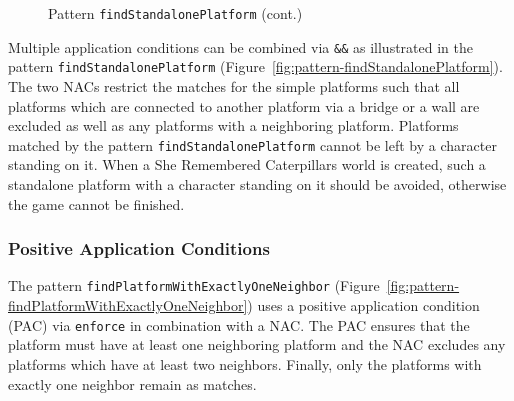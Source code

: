 \begin{figure}[h!]
	\ContinuedFloat
	\centering
	\caption[]{Pattern \texttt{findStandalonePlatform} (cont.)}
\end{figure}

\noindent
Multiple application conditions can be combined via \texttt{\&\&} as illustrated in the pattern \texttt{findStandalonePlatform} (Figure~\ref{fig:pattern-findStandalonePlatform}).
The two NACs restrict the matches for the simple platforms such that all platforms which are connected to another platform via a bridge or a wall are excluded as well as any platforms with a neighboring platform.
Platforms matched by the pattern \texttt{findStandalonePlatform} cannot be left by a character standing on it.
When a She Remembered Caterpillars world is created, such a standalone platform with a character standing on it should be avoided, otherwise the game cannot be finished.

\subsubsection{Positive Application Conditions}
The pattern \texttt{findPlatformWithExactlyOneNeighbor} (Figure~\ref{fig:pattern-findPlatformWithExactlyOneNeighbor}) uses a positive application condition (PAC) via \texttt{enforce} in combination with a NAC.
The PAC ensures that the platform must have at least one neighboring platform and the NAC excludes any platforms which have at least two neighbors.
Finally, only the platforms with exactly one neighbor remain as matches.

